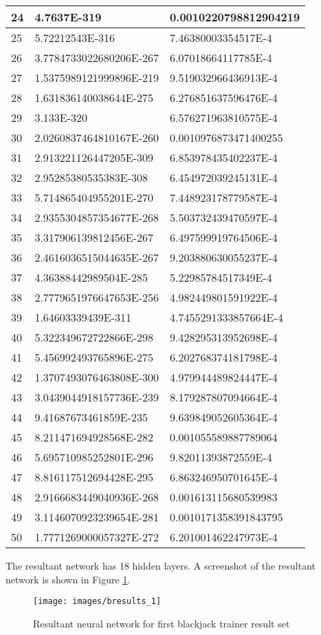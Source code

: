 \begin{center}
\begin{longtable}{ | l | l | l |}
24 &	4.7637E-319 &	0.0010220798812904219 \\ \hline
25 &	5.72212543E-316 &	7.46380003354517E-4 \\ \hline
26 &	3.7784733022680206E-267 &	6.07018664117785E-4 \\ \hline
27 &	1.5375989121999896E-219 &	9.519032966436913E-4 \\ \hline
28 &	1.631836140038644E-275 &	6.276851637596476E-4 \\ \hline
29 &	3.133E-320 &	6.576271963810575E-4 \\ \hline
30 &	2.0260837464810167E-260 &	0.0010976873471400255 \\ \hline
31 &	2.913221126447205E-309 &	6.853978435402237E-4 \\ \hline
32 &	2.95285380535383E-308 &	6.454972039245131E-4 \\ \hline
33 &	5.714865404955201E-270 &	7.448923178779587E-4 \\ \hline
34 &	2.9355304857354677E-268 &	5.503732439470597E-4 \\ \hline
35 &	3.317906139812456E-267 &	6.497599919764506E-4 \\ \hline
36 &	2.4616036515044635E-267 &	9.203880630055237E-4 \\ \hline
37 &	4.36388442989504E-285 &	5.22985784517349E-4 \\ \hline
38 &	2.7779651976647653E-256 &	4.982449801591922E-4 \\ \hline
39 &	1.64603339439E-311 &	4.7455291333857664E-4 \\ \hline
40 &	5.322349672722866E-298 &	9.428295313952698E-4 \\ \hline
41 &	5.456992493765896E-275 &	6.202768374181798E-4 \\ \hline
42 &	1.3707493076463808E-300 &	4.979944489824447E-4 \\ \hline
43 &	3.0439044918157736E-239 &	8.179287807094664E-4 \\ \hline
44 &	9.41687673461859E-235 &	9.639849052605364E-4 \\ \hline
45 &	8.211471694928568E-282 &	0.001055589887789064 \\ \hline
46 &	5.695710985252801E-296 &	9.82011393872559E-4 \\ \hline
47 &	8.816117512694428E-295 &	6.863246950701645E-4 \\ \hline
48 &	2.9166683449040936E-268 &	0.001613115680539983 \\ \hline
49 &	3.1146070923239654E-281 &	0.0010171358391843795 \\ \hline
50 &	1.7771269000057327E-272 &	6.201001462247973E-4 \\ \hline
 \end{longtable}
\end{center}

The resultant network has 18 hidden layers.
A screenshot of the resultant network is shown in Figure \ref{bresults_1}.

\begin{figure}[h!]
  \centering
  \texttt{[image: images/bresults\_1]}
  \caption{Resultant neural network for first blackjack trainer result set}
  \label{bresults_1}
\end{figure}

